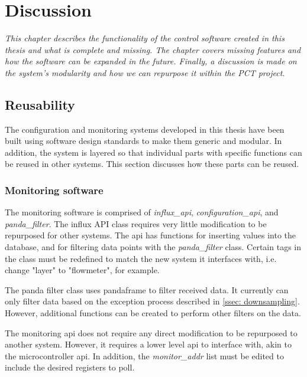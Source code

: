 \documentclass[main.tex]{subfiles}
\begin{document}

\section{Discussion}
\textit{This chapter describes the functionality of the control software created in this thesis and what is complete and missing. The chapter covers missing features and how the software can be expanded in the future. Finally, a discussion is made on the system's modularity and how we can repurpose it within the PCT project.}

\subsection{Reusability}
 
The configuration and monitoring systems developed in this thesis have been built using software design standards to make them generic and modular. In addition, the system is layered so that individual parts with specific functions can be reused in other systems. This section discusses how these parts can be reused.
 
 \subsubsection{Monitoring software}
The monitoring software is comprised of \textit{influx\_api}, \textit{configuration\_api}, and \textit{panda\_filter}. The influx API class requires very little modification to be repurposed for other systems. The \gls{api} has functions for inserting values into the database, and for filtering data points with the \textit{panda\_filter} class. Certain tags in the class must be redefined to match the new system it interfaces with, i.e. change "layer" to "flowmeter", for example.

The panda filter class uses pandaframe to filter received data. It currently can only filter data based on the exception process described in \autoref{ssec: downsampling}. However, additional functions can be created to perform other filters on the data.

The monitoring \gls{api} does not require any direct modification to be repurposed to another system. However, it requires a lower level \gls{api} to interface with, akin to the microcontroller \gls{api}. In addition, the \textit{monitor\_addr} list must be edited to include the desired registers to poll.
\end{document}
